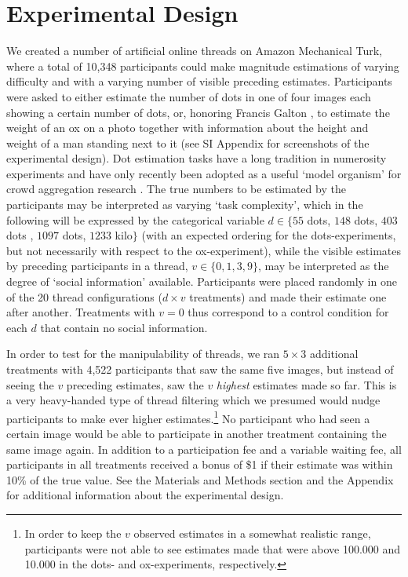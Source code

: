 \documentclass[10pt,a4paper,twocolumn,lineno]{article}
\begin{document}
\section{Experimental Design}
We created a number of artificial online threads on Amazon Mechanical Turk, where a total of 10,348 participants could make magnitude estimations of varying difficulty and with a varying number of visible preceding estimates. Participants were asked to either estimate the number of dots in one of four images each showing a certain number of dots, or, honoring Francis Galton \cite{galton1907vox}, to estimate the weight of an ox on a photo together with information about the height and weight of a man standing next to it (see SI Appendix for screenshots of the experimental design). Dot estimation tasks have a long tradition in numerosity experiments \cite{minturn1951effect, indow1977scaling, krueger1982single} and have only recently been adopted as a useful ‘model organism’ for crowd aggregation research \cite{horton2010dot, ugander2015wisdom}. The true numbers to be estimated by the participants may be interpreted as varying ‘task complexity’, which in the following will be expressed by the categorical variable $d \in \{55$ dots, $148$ dots, $403$ dots , $1097$ dots, $1233$ kilo$\}$ (with an expected ordering for the dots-experiments, but not necessarily with respect to the ox-experiment), while the visible estimates by preceding participants in a thread, $v \in \{0,1,3,9\}$, may be interpreted as the degree of ‘social information’ available. Participants were placed randomly in one of the 20 thread configurations ($d \times v$ treatments) and made their estimate one after another. Treatments with $v=0$ thus correspond to a control condition for each $d$ that contain no social information. 

In order to test for the manipulability of threads, we ran $5 \times 3$ additional treatments with 4,522 participants that saw the same five images, but instead of seeing the $v$ preceding estimates, saw the $v$ \textit{highest} estimates made so far. This is a very heavy-handed type of thread filtering which we presumed would nudge participants to make ever higher estimates.\footnote{In order to keep the $v$ observed estimates in a somewhat realistic range, participants were not able to see estimates made that were above 100.000 and 10.000 in the  dots- and ox-experiments, respectively.} No participant who had seen a certain image would be able to participate in another treatment containing the same image again. In addition to a participation fee and a variable waiting fee, all participants in all treatments received a bonus of \$1 if their estimate was within 10\% of the true value. See the Materials and Methods section and the Appendix for additional information about the experimental design.
\end{document}
